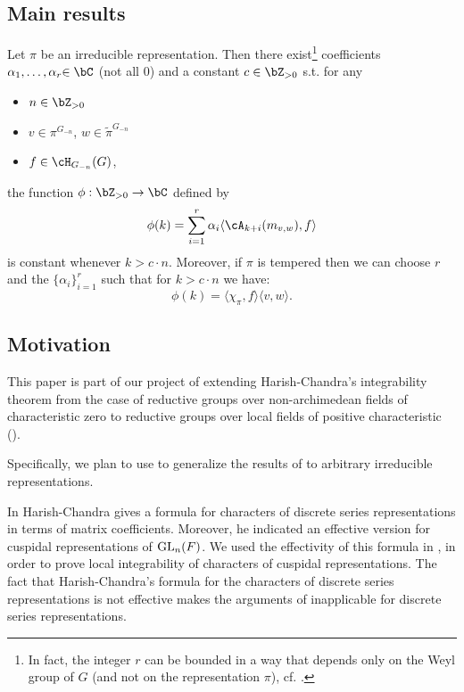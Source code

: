 \documentclass[12pt,a4paper]{amsart}%
\newcommand{\RamiA}[1]{{{#1}}}
\newcommand{\RamiC}[1]{{{#1}}}
\newcommand{\RamiD}[1]{{{#1}}}
\newcommand{\RamiF}[1]{{{#1}}}
\newcommand{\EitanD}[1]{{{#1}}}
\newcommand{\EitanC}[1]{{{#1}}}
\begin{document}
\subsection{Main results}
\begin{introtheorem}\label{thm:recur}
Let $\pi$ be an irreducible  representation. 
Then there exist\footnote{\RamiA{In fact, the integer $r$ can be bounded in a way that depends only on the Weyl group of $G$  (and not on the representation $\pi$), cf. \cite[Theorem C]{AGKS_eff_rep}.}} coefficients $\alpha_1,\dots,\alpha_r\EitanC{\in \C}$ \RamiC{(not all $0$)}  and a constant $\RamiD{c}\in \Z_{>0}$ s.t. 
for any 
    \begin{itemize}
        \item $n\in \Z_{>0}$
    \item $v \in \pi^{G_{-n}}$,  $w\in \tilde\pi^{G_{-n}}$
        \item $f\in \cH_{G_{-n}}(G)$,
    \end{itemize}
    the function 
    $\phi:\Z_{>0}\to \C$ defined by 
    $$\phi(k)=\sum_{i=1}^r  \alpha_i \langle \cA_{k+i}(m_{v,w}),f \rangle$$
    is constant whenever $k> \RamiD{c}
    \cdot n$.
Moreover,
if $\pi$ is tempered then we can choose $r$ and the \RamiF{$\{\alpha_i\}_{i=1}^r$} such that for \EitanD{$k>c
    \cdot n$}  we have: 
$$\phi(k)=\langle \chi_\pi,f\rangle \langle v,w \rangle.$$
\end{introtheorem}
\subsection{Motivation}
\RamiC{This paper is part of 
our project of extending Harish-Chandra's integrability theorem from \EitanD{the case of reductive groups over non-archimedean fields of characteristic zero} to reductive groups over local fields of positive characteristic (\cite{AGKS2,AAGKS,AGKS_jet,AGKS_orb,AGKS_eff}).}

Specifically, we plan to use   to generalize the results of \cite{AGKS2,AAGKS} to arbitrary irreducible representations.

\RamiA{In \cite{HC55,HC_VD} Harish-Chandra gives a formula for characters of discrete series  representations in terms of matrix coefficients. Moreover, he indicated an effective version for cuspidal representations \RamiF{of $\operatorname{GL}_n(F)$}. We used the effectivity of this formula 
in \cite{AGKS2}, in order to prove local integrability of characters of cuspidal representations}. \RamiA{The fact that Harish-Chandra's formula for the characters of discrete series representations is not effective} \EitanC{makes the arguments of \cite{AGKS2} inapplicable for discrete series representations}.
\end{document}
